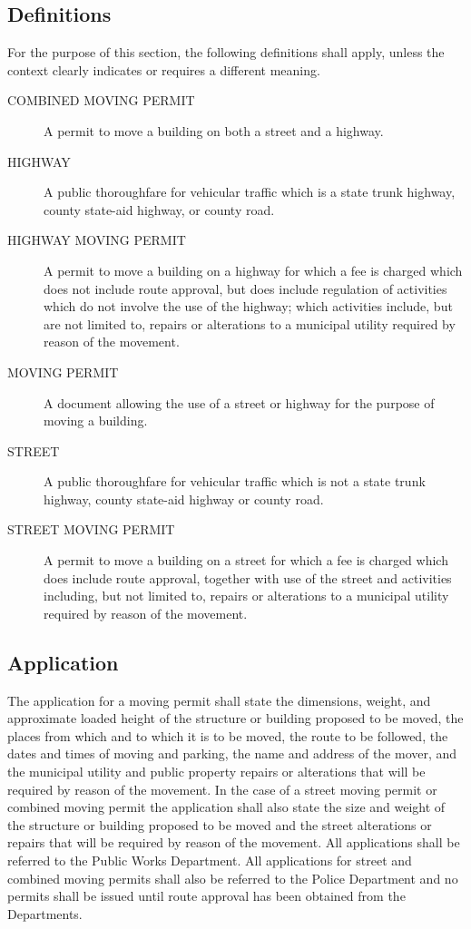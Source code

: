 \subsection{Definitions}
For the purpose of this section, the following definitions shall apply, unless the context clearly indicates or requires a different meaning.
\begin{description}
    \item[COMBINED MOVING PERMIT] A permit to move a building on both a street and a highway.
    \item[HIGHWAY] A public thoroughfare for vehicular traffic which is a state trunk highway, county state-aid highway, or county road.
    \item[HIGHWAY MOVING PERMIT] A permit to move a building on a highway for which a fee is charged which does not include route approval, but does include regulation of activities which do not involve the use of the highway; which activities include, but are not limited to, repairs or alterations to a municipal utility required by reason of the movement.
    \item[MOVING PERMIT] A document allowing the use of a street or highway for the purpose of moving a building.
    \item[STREET] A public thoroughfare for vehicular traffic which is not a state trunk highway, county state-aid highway or county road.
    \item[STREET MOVING PERMIT] A permit to move a building on a street for which a fee is charged which does include route approval, together with use of the street and activities including, but not limited to, repairs or alterations to a municipal utility required by reason of the movement.
\end{description}
\subsection{Application}
The application for a moving permit shall state the dimensions, weight, and approximate loaded height of the structure or building proposed to be moved, the places from which and to which it is to be moved, the route to be followed, the dates and times of moving and parking, the name and address of the mover, and the municipal utility and public property repairs or alterations that will be required by reason of the movement. In the case of a street moving permit or combined moving permit the application shall also state the size and weight of the structure or building proposed to be moved and the street alterations or repairs that will be required by reason of the movement. All applications shall be referred to the Public Works Department. All applications for street and combined moving permits shall also be referred to the Police Department and no permits shall be issued until route approval has been obtained from the Departments.
